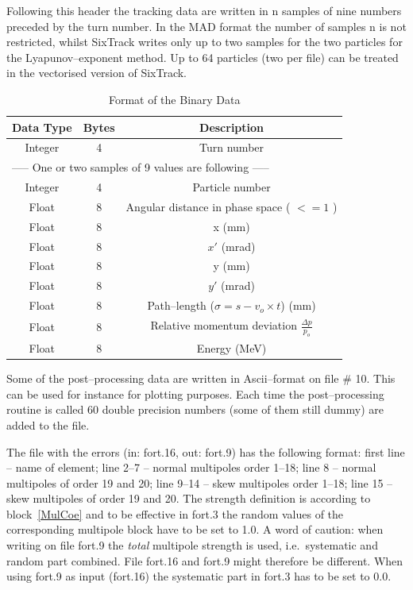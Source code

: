 \documentclass[a4paper,11pt]{report}
\begin{document}
\clearpage

Following this header the tracking data are written in n samples of
nine numbers preceded by the turn number. In the MAD format the number
of samples n is not restricted, whilst SixTrack writes only up to two
samples for the two particles for the Lyapunov--exponent method. Up to
64 particles (two per file) can be treated in the vectorised version
of SixTrack\@.

\begin{table}[h]
\caption{Format of the Binary Data}
\vspace{1em}
\label{T-FBD}
\centering
\begin{tabular}{|c|c|c|}
  \hline
  {\bf Data Type} & {\bf Bytes} & {\bf Description} \\
  \hline
  Integer & 4 & Turn number \\
  \hline \multicolumn{3}{|l|}{----- One or two samples of 9 values are
    following -----}
  \\
  \hline
  Integer & 4 & Particle number \\
  \hline
  Float & 8 & Angular distance in phase space ( $ <= 1 $ ) \\
  \hline
  Float & 8 & x (mm) \\
  \hline
  Float & 8 & $x'$ (mrad)\\
  \hline
  Float & 8 & y (mm) \\
  \hline
  Float & 8 & $y'$ (mrad) \\
  \hline
  Float & 8 & Path--length ($\sigma = s - v_o \times t$) (mm) \\
  \hline Float & 8 & Relative momentum deviation \mbox{$ \frac{\Delta
      p}{p_o}
    $}\\
  \hline
  Float & 8 & Energy (MeV) \\
  \hline
\end{tabular}
\end{table}

Some of the post--processing data are written in Ascii--format on file
\# 10. This can be used for instance for plotting purposes. Each time
the post--processing routine is called 60 double precision numbers
(some of them still dummy) are added to the file.

The file with the errors (in: fort.16, out: fort.9) has the following
format: first line -- name of element; line 2--7 -- normal multipoles
order 1--18; line 8 -- normal multipoles of order 19 and 20; line
9--14 -- skew multipoles order 1--18; line 15 -- skew multipoles of
order 19 and 20. The strength definition is according to
block~\ref{MulCoe} and to be effective in fort.3 the random values of
the corresponding multipole block have to be set to 1.0. A word of
caution: when writing on file fort.9 the {\em total} \/multipole
strength is used, i.e.\ systematic and random part combined. File
fort.16 and fort.9 might therefore be different. When using fort.9 as
input (fort.16) the systematic part in fort.3 has to be set to 0.0.
\end{document}
